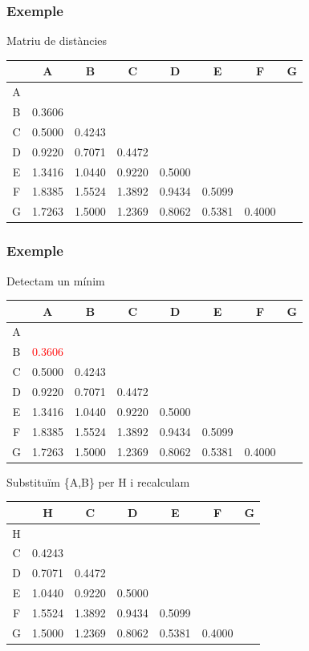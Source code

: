\documentclass[12pt,t]{beamer}
\newcommand{\red}[1]{\textcolor{red}{#1}}
\theoremstyle{plain}
\theoremstyle{definition}
\begin{document}
\begin{frame}
\frametitle{Exemple}
Matriu de distàncies
\begin{center}
\footnotesize \begin{tabular}{c|ccccccc}
& A & B & C & D & E & F & G \\
\hline
A & \\
B & 0.3606 \\
C & 0.5000 & 0.4243\\
D & 0.9220 & 0.7071 & 0.4472\\
E & 1.3416 & 1.0440 & 0.9220 & 0.5000 \\
F & 1.8385 & 1.5524 & 1.3892 & 0.9434 & 0.5099\\
G & 1.7263 & 1.5000 & 1.2369 & 0.8062 & 0.5381 & 0.4000\\
\end{tabular}
\end{center}

\end{frame}

\begin{frame}
\frametitle{Exemple}
Detectam un mínim
\begin{center}
\footnotesize \begin{tabular}{c|ccccccc}
& A & B & C & D & E & F & G \\
\hline
A & \\
B & \red{0.3606} \\
C & 0.5000 & 0.4243\\
D & 0.9220 & 0.7071 & 0.4472\\
E & 1.3416 & 1.0440 & 0.9220 & 0.5000 \\
F & 1.8385 & 1.5524 & 1.3892 & 0.9434 & 0.5099\\
G & 1.7263 & 1.5000 & 1.2369 & 0.8062 & 0.5381 & 0.4000\\
\end{tabular}
\end{center}

Substituïm \{A,B\} per H i recalculam
\begin{center}
\footnotesize \begin{tabular}{c|cccccc}
& H & C & D & E & F & G \\
\hline
H & \\
C & 0.4243\\
D & 0.7071 & 0.4472\\
E & 1.0440 & 0.9220 & 0.5000 \\
F & 1.5524 & 1.3892 & 0.9434 & 0.5099\\
G & 1.5000 & 1.2369 & 0.8062 & 0.5381 & 0.4000\\
\end{tabular}
\end{center}
\end{frame}
\end{document}
